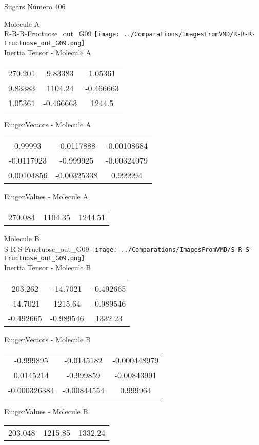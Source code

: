\vtab[-2cm]
\begin{center}
{\large Sugars \tab Número 406}
\end{center}
\begin{multicols}{2}
\begin{center}

Molecule A \\ 
R-R-R-Fructuose\_out\_G09
\texttt{[image: ../Comparations/ImagesFromVMD/R-R-R-Fructuose\_out\_G09.png]}
\\
Inertia Tensor - Molecule A \\
\vtab

\begin{tabular}{|c c c|}
270.201	 & 	9.83383	 & 	1.05361	 \\
9.83383	 & 	1104.24	 & 	-0.466663	 \\
1.05361	 & 	-0.466663	 & 	1244.5
\end{tabular}

\vtab
 EingenVectors - Molecule A     \\
\vtab
\begin{tabular}{|c c c|}
0.99993	 & 	-0.0117888	 & 	-0.00108684	 \\
-0.0117923	 & 	-0.999925	 & 	-0.00324079	 \\
0.00104856	 & 	-0.00325338	 & 	0.999994
\end{tabular}

\vtab
 EingenValues - Molecule A     \\
\vtab
\begin{tabular}{|c c c|}
270.084	 & 	1104.35	 & 	1244.51	 \\
\end{tabular}
\columnbreak

Molecule B \\ 
S-R-S-Fructuose\_out\_G09
\texttt{[image: ../Comparations/ImagesFromVMD/S-R-S-Fructuose\_out\_G09.png]}
\\
Inertia Tensor - Molecule B \\
\vtab

\begin{tabular}{|c c c|}
203.262	 & 	-14.7021	 & 	-0.492665	 \\
-14.7021	 & 	1215.64	 & 	-0.989546	 \\
-0.492665	 & 	-0.989546	 & 	1332.23
\end{tabular}

\vtab
 EingenVectors - Molecule B     \\
\vtab
\begin{tabular}{|c c c|}
-0.999895	 & 	-0.0145182	 & 	-0.000448979	 \\
0.0145214	 & 	-0.999859	 & 	-0.00843991	 \\
-0.000326384	 & 	-0.00844554	 & 	0.999964
\end{tabular}

\vtab
 EingenValues - Molecule B     \\
\vtab
\begin{tabular}{|c c c|}
203.048	 & 	1215.85	 & 	1332.24	 \\
\end{tabular}

\end{center}
\end{multicols}
